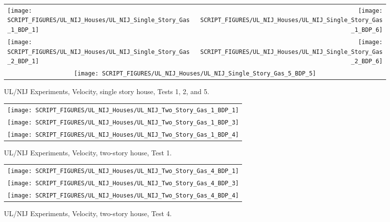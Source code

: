 \begin{figure}[p]
\begin{tabular*}{\textwidth}{l@{\extracolsep{\fill}}r}
\texttt{[image: SCRIPT\_FIGURES/UL\_NIJ\_Houses/UL\_NIJ\_Single\_Story\_Gas\_1\_BDP\_1]} &
\texttt{[image: SCRIPT\_FIGURES/UL\_NIJ\_Houses/UL\_NIJ\_Single\_Story\_Gas\_1\_BDP\_6]} \\
\texttt{[image: SCRIPT\_FIGURES/UL\_NIJ\_Houses/UL\_NIJ\_Single\_Story\_Gas\_2\_BDP\_1]} &
\texttt{[image: SCRIPT\_FIGURES/UL\_NIJ\_Houses/UL\_NIJ\_Single\_Story\_Gas\_2\_BDP\_6]} \\
\multicolumn{2}{c}{\texttt{[image: SCRIPT\_FIGURES/UL\_NIJ\_Houses/UL\_NIJ\_Single\_Story\_Gas\_5\_BDP\_5]}}
\end{tabular*}
\caption[UL/NIJ Experiments, Velocity, single story house, Tests 1, 2, and 5]{UL/NIJ Experiments, Velocity, single story house, Tests 1, 2, and 5.}
\label{UL_NIJ_Vel_Ranch_123}
\end{figure}

\begin{figure}[p]
\begin{center}
\begin{tabular}{c}
\texttt{[image: SCRIPT\_FIGURES/UL\_NIJ\_Houses/UL\_NIJ\_Two\_Story\_Gas\_1\_BDP\_1]} \\
\texttt{[image: SCRIPT\_FIGURES/UL\_NIJ\_Houses/UL\_NIJ\_Two\_Story\_Gas\_1\_BDP\_3]} \\
\texttt{[image: SCRIPT\_FIGURES/UL\_NIJ\_Houses/UL\_NIJ\_Two\_Story\_Gas\_1\_BDP\_4]}
\end{tabular}
\end{center}
\caption[UL/NIJ Experiments, Velocity, two-story house, Test 1]{UL/NIJ Experiments, Velocity, two-story house, Test 1.}
\label{UL_NIJ_Vel_Colonial_1}
\end{figure}

\begin{figure}[p]
\begin{center}
\begin{tabular}{c}
\texttt{[image: SCRIPT\_FIGURES/UL\_NIJ\_Houses/UL\_NIJ\_Two\_Story\_Gas\_4\_BDP\_1]} \\
\texttt{[image: SCRIPT\_FIGURES/UL\_NIJ\_Houses/UL\_NIJ\_Two\_Story\_Gas\_4\_BDP\_3]} \\
\texttt{[image: SCRIPT\_FIGURES/UL\_NIJ\_Houses/UL\_NIJ\_Two\_Story\_Gas\_4\_BDP\_4]}
\end{tabular}
\end{center}
\caption[UL/NIJ Experiments, Velocity, two-story house, Test 4]{UL/NIJ Experiments, Velocity, two-story house, Test 4.}
\label{UL_NIJ_Vel_Colonial_4}
\end{figure}

